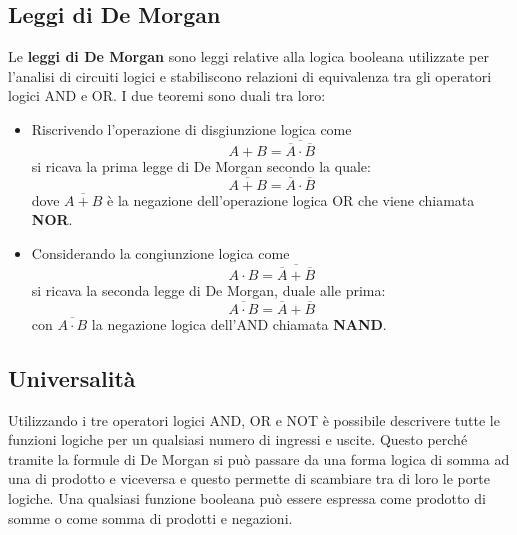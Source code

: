 \documentclass[12pt, a4paper]{report}
\begin{document}
\subsection{Leggi di De Morgan}
Le \textbf{leggi di De Morgan} sono leggi relative alla logica booleana utilizzate per l'analisi di circuiti logici e stabiliscono relazioni di equivalenza tra gli operatori logici AND e OR. I due teoremi sono duali tra loro:
\begin{itemize}
    \item Riscrivendo l'operazione di disgiunzione logica come
    \begin{equation*}
        A + B = \overline{\overline{A} \cdot \overline{B}}
    \end{equation*}
    si ricava la prima legge di De Morgan secondo la quale:
    \begin{equation}
        \overline{A + B} = \overline{A} \cdot \overline{B}
    \end{equation}
    dove $\overline{A + B}$ è la negazione dell'operazione logica OR che viene chiamata \textbf{NOR}.
    \item Considerando la congiunzione logica come
    \begin{equation*}
        A \cdot B = \overline{\overline{A} + \overline{B}}
    \end{equation*}
    si ricava la seconda legge di De Morgan, duale alle prima:
    \begin{equation}
        \overline{A \cdot B} = \overline{A} + \overline{B}
    \end{equation}
    con $\overline{A \cdot B}$ la negazione logica dell'AND chiamata \textbf{NAND}.
\end{itemize}

\subsection{Universalità}
Utilizzando i tre operatori logici AND, OR e NOT è possibile descrivere tutte le funzioni logiche per un qualsiasi numero di ingressi e uscite. Questo perché tramite la formule di De Morgan si può passare da una forma logica di somma ad una di prodotto e viceversa e questo permette di scambiare tra di loro le porte logiche. Una qualsiasi funzione booleana può essere espressa come prodotto di somme o come somma di prodotti e negazioni.
\end{document}
